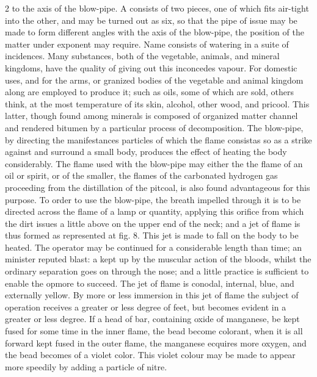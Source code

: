 \documentclass[10pt]{article}
\begin{document}
\begin{multicols}{2}\raggedcolumns
to the axis of the blow-pipe. A consists of two pieces, one of which fits air-tight into the other, and may be turned out as six, so that the pipe of issue may be made to form different angles with the axis of the blow-pipe, the position of the matter under exponent may require. Name consists of watering in a suite of incidences. Many substances, both of the vegetable, animals, and mineral kingdoms, have the quality of giving out this inconcedes vapour. For domestic uses, and for the arms, or granized bodies of the vegetable and animal kingdom along are employed to produce it; such as oils, some of which are sold, others think, at the most temperature of its skin, alcohol, other wood, and pricool. This latter, though found among minerals is composed of organized matter channel and rendered bitumen by a particular process of decomposition. The blow-pipe, by directing the manifestances particles of which the flame consistas so as a strike against and surround a small body, produces the effect of heating the body considerably. The flame used with the blow-pipe may either the the flame of an oil or spirit, or of the smaller, the flames of the carbonated hydrogen gas proceeding from the distillation of the pitcoal, is also found advantageous for this purpose. To order to use the blow-pipe, the breath impelled through it is to be directed across the flame of a lamp or quantity, applying this orifice from which the dirt issues a little above on the upper end of the neck; and a jet of flame is thus formed as represented at fig. 8. This jet is made to fall on the body to be heated. The operator may be continued for a considerable length than time; an minister reputed blast: a kept up by the muscular action of the bloods, whilst the ordinary separation goes on through the nose; and a little practice is sufficient to enable the opmore to succeed. The jet of flame is conodal, internal, blue, and externally yellow. By more or less immersion in this jet of flame the subject of operation receives a greater or less degree of feet, but becomes evident in a greater or less degree. If a head of bar, containing oxide of manganese, be kept fused for some time in the inner flame, the bead become colorant, when it is all forward kept fused in the outer flame, the manganese ecquires more oxygen, and the bead becomes of a violet color. This violet colour may be made to appear more speedily by adding a particle of nitre.


\end{multicols}
\end{document}

